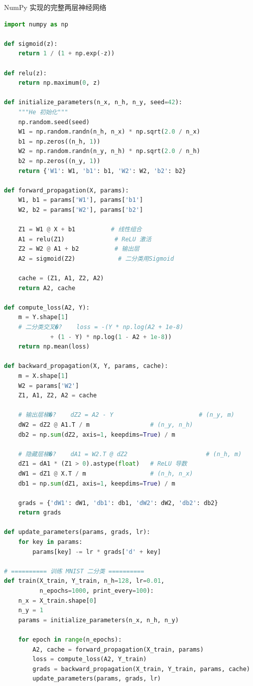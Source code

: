\begin{mycode}{NumPy 实现的完整两层神经网络}
\begin{lstlisting}[language=Python]
import numpy as np

def sigmoid(z):
    return 1 / (1 + np.exp(-z))

def relu(z):
    return np.maximum(0, z)

def initialize_parameters(n_x, n_h, n_y, seed=42):
    """He 初始化"""
    np.random.seed(seed)
    W1 = np.random.randn(n_h, n_x) * np.sqrt(2.0 / n_x)
    b1 = np.zeros((n_h, 1))
    W2 = np.random.randn(n_y, n_h) * np.sqrt(2.0 / n_h)
    b2 = np.zeros((n_y, 1))
    return {'W1': W1, 'b1': b1, 'W2': W2, 'b2': b2}

def forward_propagation(X, params):
    W1, b1 = params['W1'], params['b1']
    W2, b2 = params['W2'], params['b2']

    Z1 = W1 @ X + b1          # 线性组合
    A1 = relu(Z1)              # ReLU 激活
    Z2 = W2 @ A1 + b2          # 输出层
    A2 = sigmoid(Z2)            # 二分类用Sigmoid

    cache = (Z1, A1, Z2, A2)
    return A2, cache

def compute_loss(A2, Y):
    m = Y.shape[1]
    # 二分类交叉�?    loss = -(Y * np.log(A2 + 1e-8)
             + (1 - Y) * np.log(1 - A2 + 1e-8))
    return np.mean(loss)

def backward_propagation(X, Y, params, cache):
    m = X.shape[1]
    W2 = params['W2']
    Z1, A1, Z2, A2 = cache

    # 输出层梯�?    dZ2 = A2 - Y                        # (n_y, m)
    dW2 = dZ2 @ A1.T / m                 # (n_y, n_h)
    db2 = np.sum(dZ2, axis=1, keepdims=True) / m

    # 隐藏层梯�?    dA1 = W2.T @ dZ2                      # (n_h, m)
    dZ1 = dA1 * (Z1 > 0).astype(float)   # ReLU 导数
    dW1 = dZ1 @ X.T / m                  # (n_h, n_x)
    db1 = np.sum(dZ1, axis=1, keepdims=True) / m

    grads = {'dW1': dW1, 'db1': db1, 'dW2': dW2, 'db2': db2}
    return grads

def update_parameters(params, grads, lr):
    for key in params:
        params[key] -= lr * grads['d' + key]

# ========== 训练 MNIST 二分类 ==========
def train(X_train, Y_train, n_h=128, lr=0.01,
          n_epochs=1000, print_every=100):
    n_x = X_train.shape[0]
    n_y = 1
    params = initialize_parameters(n_x, n_h, n_y)

    for epoch in range(n_epochs):
        A2, cache = forward_propagation(X_train, params)
        loss = compute_loss(A2, Y_train)
        grads = backward_propagation(X_train, Y_train, params, cache)
        update_parameters(params, grads, lr)


\end{lstlisting}
\end{mycode}
